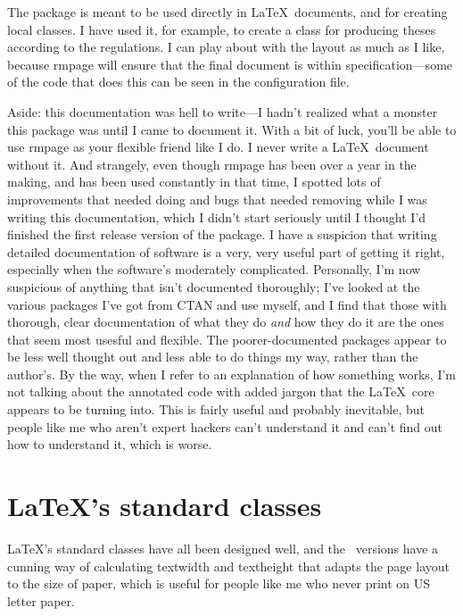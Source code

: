 \documentclass[11pt,loose,twoside,touchwider,longish,
                      noheaders,a4paper,notstdmargins]{report}
\DeclareRobustCommand*{\comname}[1]{{\ttfamily\makeatletter\bs #1\makeatother}}
\newcommand*{\classname}[1]{{\ttfamily #1}}
\newcommand*{\rmpage}{\classname{rmpage}\xspace}
\begin{document}
The package is meant to be used directly in \LaTeX\
documents, and for creating local classes.  I have used it, for
example, to create a class for producing theses according to the
regulations.  I can play about with the layout as much as I like,
because \rmpage will ensure that the final document is within
specification---some of the code that does this can be seen in the
configuration file.


Aside: this documentation was hell to write---I hadn't realized what a 
monster this package was until I came to document it.  With a bit of 
luck, you'll be able to use \rmpage as your flexible friend like I do.  
I never write a \LaTeX\ document without it.  And strangely, even 
though \rmpage has been over a year in the making, and has been used 
constantly in that time, I spotted lots of improvements that needed 
doing and bugs that needed removing while I was writing this 
documentation, which I didn't start seriously until I thought I'd 
finished the first release version of the package.  I have a suspicion 
that writing detailed documentation of software is a very, very useful 
part of getting it right, especially when the software's moderately 
complicated.  Personally, I'm now suspicious of anything that isn't 
documented thoroughly; I've looked at the various packages I've got 
from CTAN and use myself, and I find that those with thorough, clear 
documentation of what they do \emph{and} how they do it are the ones 
that seem most usesful and flexible.  The poorer-documented packages 
appear to be less well thought out and less able to do things my way, 
rather than the author's.  By the way, when I refer to an explanation 
of how something works, I'm not talking about the annotated code with 
added jargon that the \LaTeX\ core appears to be turning into.  This 
is fairly useful and probably inevitable, but people like me who 
aren't expert hackers can't understand it and can't find out how to 
understand it, which is worse.


\section{\LaTeX's standard classes}

\label{gen:standardclassproblems}

\LaTeX's standard classes have all been designed well, and the
\LaTeXe\ versions have a cunning way of calculating
\comname{textwidth} and \comname{textheight} that adapts the page
layout to the size of paper, which is useful for people like me who
never print on US letter paper.
\end{document}
